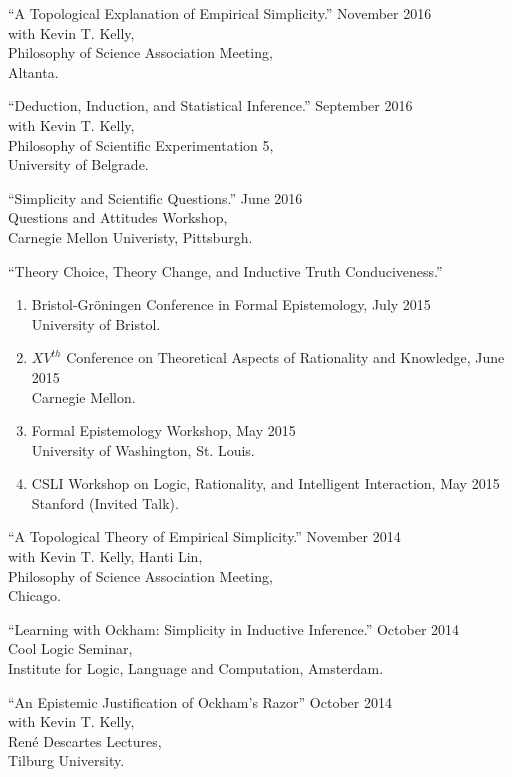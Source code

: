 \documentclass[12pt]{res} %
\begin{document}
\begin{resume}
``A Topological Explanation of Empirical Simplicity.'' \hfill November 2016\\
with Kevin T. Kelly,\\
Philosophy of Science Association Meeting, \\
Altanta.

``Deduction, Induction, and Statistical Inference.'' \hfill September 2016\\
with Kevin T. Kelly,\\
Philosophy of Scientific Experimentation 5,\\
University of Belgrade.

``Simplicity and Scientific Questions.'' \hfill June 2016\\ 
Questions and Attitudes Workshop,\\
Carnegie Mellon Univeristy, Pittsburgh.

``Theory Choice, Theory Change, and Inductive Truth Conduciveness.''\\
\begin{enumerate}
\item Bristol-Gr\"{o}ningen Conference in Formal Epistemology, \hfill July 2015 \\University of Bristol. 
\item $XV^{th}$ Conference on Theoretical Aspects of Rationality and Knowledge, \hfill June 2015\\ Carnegie Mellon. 
\item Formal Epistemology Workshop, \hfill May 2015\\ University of Washington, St. Louis. 
\item CSLI Workshop on Logic, Rationality, and Intelligent Interaction, \hfill May 2015\\ Stanford (Invited Talk). 
\end{enumerate}

``A Topological Theory of Empirical Simplicity.'' \hfill November 2014\\
with Kevin T. Kelly, Hanti Lin,\\
Philosophy of Science Association Meeting,\\
Chicago.

``Learning with Ockham: Simplicity in Inductive Inference.'' \hfill October 2014\\
Cool Logic Seminar,\\ 
Institute for Logic, Language and Computation, Amsterdam.

``An Epistemic Justification of Ockham's Razor'' \hfill October 2014\\ with Kevin T. Kelly,\\ Ren\'{e} Descartes Lectures,\\
Tilburg University.


\end{resume}
\end{document}
